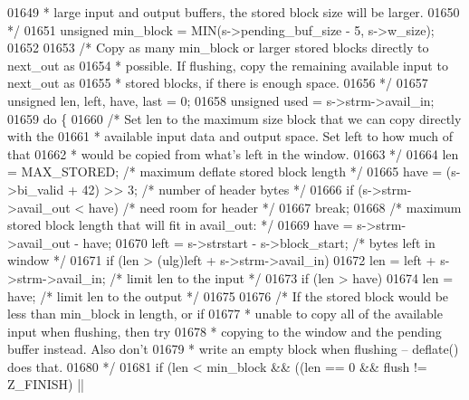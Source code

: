 \begin{DoxyCode}
{{{{{01649 \textcolor{comment}{     * large input and output buffers, the stored block size will be larger.}
01650 \textcolor{comment}{     */}
01651     \textcolor{keywordtype}{unsigned} min\_block = MIN(s->pending\_buf\_size - 5, s->w\_size);
01652 
01653     \textcolor{comment}{/* Copy as many min\_block or larger stored blocks directly to next\_out as}
01654 \textcolor{comment}{     * possible. If flushing, copy the remaining available input to next\_out as}
01655 \textcolor{comment}{     * stored blocks, if there is enough space.}
01656 \textcolor{comment}{     */}
01657     \textcolor{keywordtype}{unsigned} len, left, have, last = 0;
01658     \textcolor{keywordtype}{unsigned} used = s->strm->avail\_in;
01659     \textcolor{keywordflow}{do} \{
01660         \textcolor{comment}{/* Set len to the maximum size block that we can copy directly with the}
01661 \textcolor{comment}{         * available input data and output space. Set left to how much of that}
01662 \textcolor{comment}{         * would be copied from what's left in the window.}
01663 \textcolor{comment}{         */}
01664         len = MAX\_STORED;       \textcolor{comment}{/* maximum deflate stored block length */}
01665         have = (s->bi\_valid + 42) >> 3;         \textcolor{comment}{/* number of header bytes */}
01666         \textcolor{keywordflow}{if} (s->strm->avail\_out < have)          \textcolor{comment}{/* need room for header */}
01667             \textcolor{keywordflow}{break};
01668             \textcolor{comment}{/* maximum stored block length that will fit in avail\_out: */}
01669         have = s->strm->avail\_out - have;
01670         left = s->strstart - s->block\_start;    \textcolor{comment}{/* bytes left in window */}
01671         \textcolor{keywordflow}{if} (len > (ulg)left + s->strm->avail\_in)
01672             len = left + s->strm->avail\_in;     \textcolor{comment}{/* limit len to the input */}
01673         if (len > have)
01674             len = have;                         \textcolor{comment}{/* limit len to the output */}
01675 
01676         \textcolor{comment}{/* If the stored block would be less than min\_block in length, or if}
01677 \textcolor{comment}{         * unable to copy all of the available input when flushing, then try}
01678 \textcolor{comment}{         * copying to the window and the pending buffer instead. Also don't}
01679 \textcolor{comment}{         * write an empty block when flushing -- deflate() does that.}
01680 \textcolor{comment}{         */}
01681         \textcolor{keywordflow}{if} (len < min\_block && ((len == 0 && flush != Z\_FINISH) ||
}}}}}
\end{DoxyCode}
